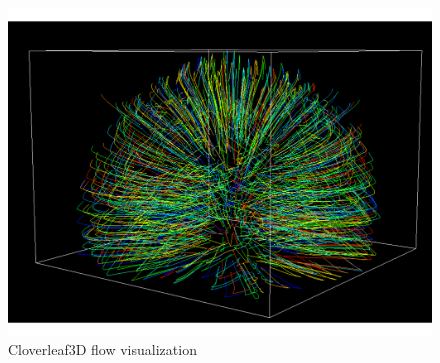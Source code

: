 \begin{figure}[t]
\centering
\includegraphics[width=0.7\linewidth]{images/pathlines_clover.pdf}
\caption{Cloverleaf3D flow visualization}
\label{fig:pathlines_clover}
\end{figure}


